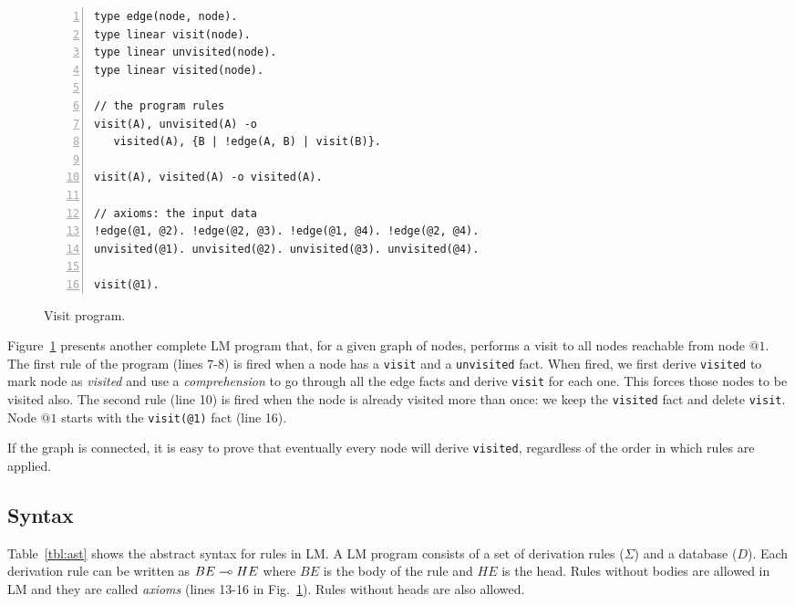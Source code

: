 \begin{figure}[h!]
\small\begin{Verbatim}[numbers=left]
type edge(node, node).
type linear visit(node).
type linear unvisited(node).
type linear visited(node).

// the program rules
visit(A), unvisited(A) -o
   visited(A), {B | !edge(A, B) | visit(B)}.

visit(A), visited(A) -o visited(A).

// axioms: the input data
!edge(@1, @2). !edge(@2, @3). !edge(@1, @4). !edge(@2, @4).
unvisited(@1). unvisited(@2). unvisited(@3). unvisited(@4).

visit(@1).
\end{Verbatim}
  \caption{Visit program.}
  \label{code:visit}
\end{figure}
\normalsize

Figure~\ref{code:visit} presents another complete LM program that, for a given graph
of nodes, performs a visit to all nodes reachable from node $@1$.
The first rule of the program (lines 7-8) is fired when a node has a \texttt{visit} and a \texttt{unvisited} fact.
When fired, we first derive \texttt{visited} to mark node as \textit{visited} and use a
\emph{comprehension} to go through all the edge facts and derive \texttt{visit} for each
one. This forces those nodes to be visited also. The second rule (line 10) is fired when the
node is already visited more than once: we keep the \texttt{visited} fact and delete \texttt{visit}.
Node $@1$ starts with the \texttt{visit(@1)} fact (line 16).

If the graph is connected, it is easy to prove that eventually every node will derive \texttt{visited},
regardless of the order in which rules are applied.

\subsection{Syntax}

Table~\ref{tbl:ast} shows the abstract syntax for rules in LM.
A LM program consists of a set of derivation rules ($\Sigma$) and a database ($D$).
Each derivation rule can be written as $BE \multimap HE$ where $BE$ is the body of the rule and
$HE$ is the head. Rules without bodies are allowed in LM and they are called \textit{axioms} (lines 13-16 in Fig.~\ref{code:visit}). Rules without heads are also allowed.

